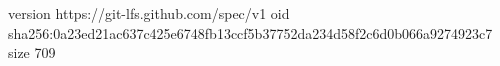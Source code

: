version https://git-lfs.github.com/spec/v1
oid sha256:0a23ed21ac637c425e6748fb13ccf5b37752da234d58f2c6d0b066a9274923c7
size 709
